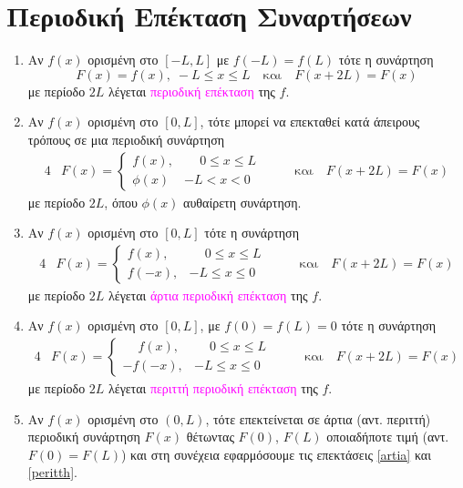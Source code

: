 \section{Περιοδική Επέκταση Συναρτήσεων}

\vspace{\baselineskip}

\begin{enumerate}

    \item Αν $ f(x) $ ορισμένη στο $ [-L,L] $ με $ f(-L)=f(L) $ τότε η συνάρτηση
        \[
            F(x) = f(x), \; -L \leq x \leq L \quad \text{και} \quad F(x+2L)=F(x)
        \]
        με περίοδο $ 2L $ λέγεται \textcolor{magenta}{περιοδική επέκταση} της $f$. 

    \item Αν $ f(x) $ ορισμένη στο $ [0,L] $, τότε μπορεί να επεκταθεί κατά άπειρους τρόπους 
        σε μια περιοδική συνάρτηση 
        \begin{alignat*}{4}
            &F(x) = 
            \begin{cases}  
            f(x), & \phantom{-} 0 \leq x \leq L \\
            \phi(x) & -L < x < 0
        \end{cases}  & \quad & \text{και} \quad F(x+2L)=F(x)
        \end{alignat*}
        με περίοδο $ 2L $, όπου $ \phi(x) $ αυθαίρετη συνάρτηση. 

    \item \label{artia} Αν $ f(x) $ ορισμένη στο $ [0,L] $ τότε η συνάρτηση 
        \begin{alignat*}{4}
            &F(x) = 
            \begin{cases}  
            f(x), & \phantom{-} 0 \leq x \leq L \\
            f(-x), & -L \leq x \leq 0
        \end{cases}  & \quad & \text{και} \quad F(x+2L)=F(x)
        \end{alignat*}
        με περίοδο $ 2L $ λέγεται \textcolor{magenta}{άρτια περιοδική επέκταση} της $f$.

    \item \label{peritth} Αν $ f(x) $ ορισμένη στο $ [0,L] $, με $ f(0)=f(L)=0 $ τότε η συνάρτηση
        \begin{alignat*}{4}
            &F(x) = 
            \begin{cases}  
            \phantom{-} f(x), & \phantom{-} 0 \leq x \leq L \\
            -f(-x), & -L \leq x \leq 0
        \end{cases}  & \quad & \text{και} \quad F(x+2L)=F(x)
        \end{alignat*}
        με περίοδο $ 2L $ λέγεται \textcolor{magenta}{περιττή περιοδική επέκταση} της $f$.

    \item Αν $ f(x) $ ορισμένη στο $ (0,L) $, τότε επεκτείνεται σε άρτια (αντ. περιττή) περιοδική
        συνάρτηση $ F(x) $ θέτωντας $ F(0) $, $ F(L) $ οποιαδήποτε τιμή (αντ. $F(0)=F(L)$) και στη
        συνέχεια εφαρμόσουμε τις επεκτάσεις \ref{artia} και \ref{peritth}.

\end{enumerate}







